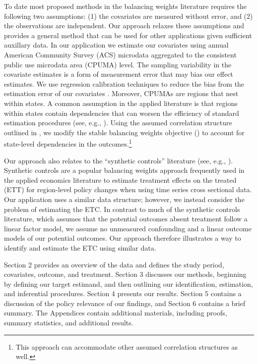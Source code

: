 \documentclass[aoas]{imsart}
\theoremstyle{plain}
\theoremstyle{remark}
\begin{document}
To date most proposed methods in the balancing weights literature requires the following two assumptions: (1) the covariates are measured without error, and (2) the observations are independent. Our approach relaxes these assumptions and provides a general method that can be used for other applications given sufficient auxillary data. In our application we estimate our covariates using annual American Community Survey (ACS) microdata aggregated to the consistent public use microdata area (CPUMA) level. The sampling variability in the covariate estimates is a form of measurement error that may bias our effect estimates. We use regression calibration techniques to reduce the bias from the estimation error of our covariates \cite{gleser1992importance}. Moreover, CPUMAs are regions that nest within states. A common assumption in the applied literature is that regions within states contain dependencies that can worsen the efficiency of standard estimation procedures (see, e.g., \cite{cameron2015practitioner}). Using the assumed correlation structure outlined in \cite{kloek1981ols}, we modify the stable balancing weights objective (\cite{zubizarreta2015stable}) to account for state-level dependencies in the outcomes.\footnote{This approach can accommodate other assumed correlation structures as well.}

Our approach also relates to the ``synthetic controls'' literature (see, e.g., \cite{abadie2010synthetic}). Synthetic controls are a popular balancing weights approach frequently used in the applied economics literature to estimate treatment effects on the treated (ETT) for region-level policy changes when using time series cross sectional data. Our application uses a similar data structure; however, we instead consider the problem of estimating the ETC. In contrast to much of the synthetic controls literature, which assumes that the potential outcomes absent treatment follow a linear factor model, we assume no unmeasured confounding and a linear outcome models of our potential outcomes. Our approach therefore illustrates a way to identify and estimate the ETC using similar data.

Section 2 provides an overview of the data and defines the study period, covariates, outcome, and treatment. Section 3 discusses our methods, beginning by defining our target estimand, and then outlining our identification, estimation, and inferential procedures. Section 4 presents our results. Section 5 contains a discussion of the policy relevance of our findings, and Section 6 contains a brief summary. The Appendices contain additional materials, including proofs, summary statistics, and additional results.
\end{document}
